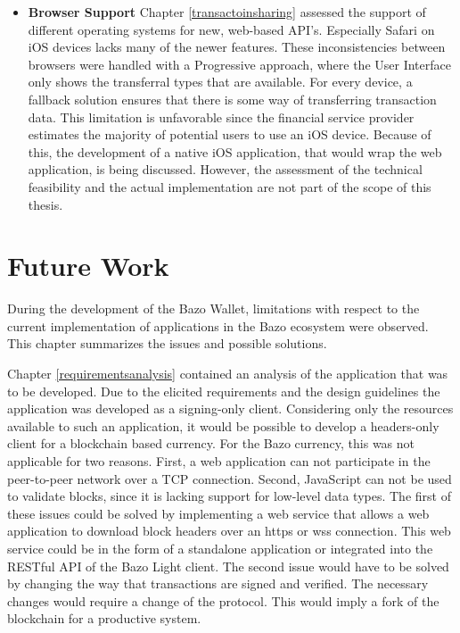 \begin{itemize}
\item \textbf{Browser Support} 
Chapter \ref{transactoinsharing} assessed the support of different operating systems for new, web-based API's. Especially Safari on iOS devices lacks many of the newer features. These inconsistencies between browsers were handled with a Progressive approach, where the User Interface only shows the transferral types that are available. For every device, a fallback solution ensures that there is some way of transferring transaction data.
This limitation is unfavorable since the financial service provider estimates the majority of potential users to use an iOS device. Because of this, the development of a native iOS application, that would wrap the web application, is being discussed. However, the assessment of the technical feasibility and the actual implementation are not part of the scope of this thesis.

\end{itemize}

\section{Future Work}
During the development of the Bazo Wallet, limitations with respect to the current implementation of applications in the Bazo ecosystem were observed. This chapter summarizes the issues and possible solutions.

Chapter \ref{requirementsanalysis} contained an analysis of the application that was to be developed. Due to the elicited requirements and the design guidelines the application was developed as a signing-only client. Considering only the resources available to such an application, it would be possible to develop a headers-only client for a blockchain based currency. For the Bazo currency, this was not applicable for two reasons. First, a web application can not participate in the peer-to-peer network over a TCP connection. Second, JavaScript can not be used to validate blocks, since it is lacking support for low-level data types. The first of these issues could be solved by implementing a web service that allows a web application to download block headers over an https or wss connection. This web service could be in the form of a standalone application or integrated into the RESTful API of the Bazo Light client. The second issue would have to be solved by changing the way that transactions are signed and verified. The necessary changes would require a change of the protocol. This would imply a fork of the blockchain for a productive system.

